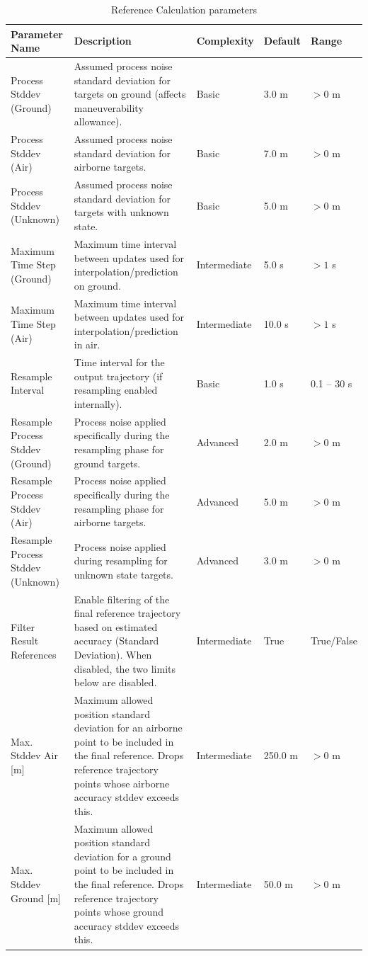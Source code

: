 \begin{table}[H]
    \centering
    \footnotesize
    \hspace*{-1.5cm}
    \begin{tabular}{|p{4.5cm}|p{6.5cm}|l|l|l|}
    \hline
    \textbf{Parameter Name} & \textbf{Description} & \textbf{Complexity} & \textbf{Default} & \textbf{Range} \\ \hline
    Process Stddev (Ground) & Assumed process noise standard deviation for targets on ground (affects maneuverability allowance). & Basic & 3.0 m & $>0$ m \\ \hline
    Process Stddev (Air) & Assumed process noise standard deviation for airborne targets. & Basic & 7.0 m & $>0$ m \\ \hline
    Process Stddev (Unknown) & Assumed process noise standard deviation for targets with unknown state. & Basic & 5.0 m & $>0$ m \\ \hline
    Maximum Time Step (Ground) & Maximum time interval between updates used for interpolation/prediction on ground. & Intermediate & 5.0 s & $>1$ s \\ \hline
    Maximum Time Step (Air) & Maximum time interval between updates used for interpolation/prediction in air. & Intermediate & 10.0 s & $>1$ s \\ \hline
    Resample Interval & Time interval for the output trajectory (if resampling enabled internally). & Basic & 1.0 s & 0.1 -- 30 s \\ \hline
    Resample Process Stddev (Ground) & Process noise applied specifically during the resampling phase for ground targets. & Advanced & 2.0 m & $>0$ m \\ \hline
    Resample Process Stddev (Air) & Process noise applied specifically during the resampling phase for airborne targets. & Advanced & 5.0 m & $>0$ m \\ \hline
    Resample Process Stddev (Unknown) & Process noise applied during resampling for unknown state targets. & Advanced & 3.0 m & $>0$ m \\ \hline
    Filter Result References & Enable filtering of the final reference trajectory based on estimated accuracy (Standard Deviation). When disabled, the two limits below are disabled. & Intermediate & True & True/False \\ \hline
    Max. Stddev Air [m] & Maximum allowed position standard deviation for an airborne point to be included in the final reference. Drops reference trajectory points whose airborne accuracy stddev exceeds this. & Intermediate & 250.0 m & $>0$ m \\ \hline
    Max. Stddev Ground [m] & Maximum allowed position standard deviation for a ground point to be included in the final reference. Drops reference trajectory points whose ground accuracy stddev exceeds this. & Intermediate & 50.0 m & $>0$ m \\ \hline
    \end{tabular}
    \caption{Reference Calculation parameters}
    \label{tab:reconst_params}
\end{table}

